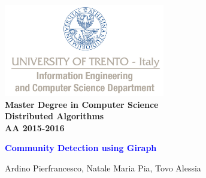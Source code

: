\documentclass[12pt]{article}
\begin{document}
  \begin{titlepage}
      \centering
      ~~~~~~~~~~~~~\\[-30mm]
      \includegraphics[keepaspectratio=true, width=7cm]{bg_eng_1r.jpg} \\[10mm]

     {
     \large \bfseries Master Degree in Computer Science\\[3mm]
     Distributed Algorithms\\[3mm]
     AA 2015-2016
     }\\[10mm]


     \vspace{0.5cm}
     {
     \Large \bfseries \textcolor{blue}{Community Detection using Giraph} \par
     }
     \vspace{0.5cm}
     {\large {Ardino Pierfrancesco, Natale Maria Pia, Tovo Alessia}}

     \vspace{0.3cm}


\end{titlepage}
\end{document}
